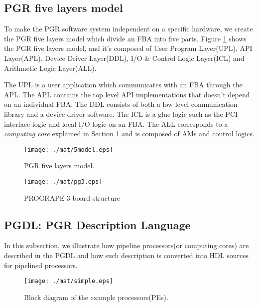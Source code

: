 \documentclass{llncs}
\begin{document}
\subsection{PGR five layers model}
To make the PGR software system independent on a specific hardware,
we create the PGR five layers model which divide 
an FBA into five parts.
Figure \ref{fig5model} shows the PGR five layers model, 
and it's composed of User Program Layer(UPL), API Layer(APL),
Device Driver Layer(DDL), I/O \& Control Logic Layer(ICL) and
Arithmetic Logic Layer(ALL).

The UPL is a user application which communicates with an FBA through the APL.
The APL contains the top level API implementations that
doesn't depend on an individual FBA.
The DDL consists of both a low level communication library and a device driver software. 
The ICL is a glue logic such as the PCI interface logic and 
local I/O logic on an FBA.
The ALL corresponds to a {\it computing core} explained in Section 1
and is composed of AMs and control logics.

\begin{figure}[htb]
\begin{center}
  \begin{minipage}{.45\linewidth}
    \begin{center}
    \texttt{[image: ./mat/5model.eps]}
    \caption{PGR five layers model.}
    \label{fig5model}
    \end{center}
  \end{minipage}
  \hspace{2.4pc}
  \begin{minipage}{.45\linewidth}
    \begin{center}
    \texttt{[image: ./mat/pg3.eps]}
    \caption{PROGRAPE-3 board structure}
    \end{center}
  \end{minipage}
\end{center}
\end{figure}

\subsection{PGDL: PGR Description Language}
In this subsection, we illustrate how pipeline processors(or computing cores)
are described in the PGDL and how such description is converted 
into HDL sources for pipelined processors.

\begin{figure}[htb]
\begin{center}
\texttt{[image: ./mat/simple.eps]}
\caption{Block diagram of the example processors(PEs).}
\label{fig4}
\end{center}
\end{figure}
\end{document}
